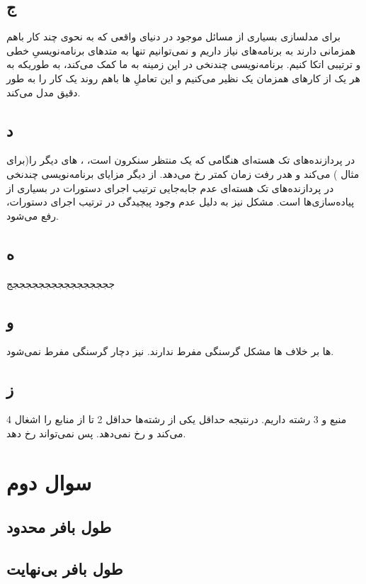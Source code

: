 \documentclass{article}
\begin{document}
\subsection{ج}
برای مدلسازی بسیاری از مسائل موجود در دنیای واقعی که به نحوی چند کار باهم همزمانی دارند به برنامه‌های  نیاز داریم و نمی‌توانیم تنها به متدهای برنامه‌نویسیِ خطی و ترتیبی اتکا کنیم. برنامه‌نویسی چندنخی در این زمینه به ما کمک می‌کند، به طوریکه به هر یک از کارهای همزمان یک  نظیر می‌کنیم و این تعاملِ ها باهم روند یک کار را به طور دقیق مدل می‌کند.
\subsection{د}
در پردازنده‌های تک هسته‌ای هنگامی که یک  منتظر  سنکرون است، ،  های دیگر را(برای مثال )  می‌کند و هدر رفت زمان کمتر رخ می‌دهد. از دیگر مزایای برنامه‌نویسی چندنخی در پردازنده‌های تک هسته‌ای عدم جا‌به‌جایی ترتیب اجرای دستورات در بسیاری از پیاده‌سازی‌ها است. مشکل  نیز به دلیل عدم وجود پیچیدگی در ترتیب اجرای دستورات، رفع می‌شود.
\subsection{ه}
ججججججججججججججججج

\subsection{و}
ها بر خلاف ها مشکل گرسنگی مفرط ندارند.  نیز دچار گرسنگی مفرط نمی‌شود.
\subsection{ز}
4 منبع و 3 رشته داریم. درنتیجه حداقل یکی از رشته‌ها حداقل 2 تا از منابع را اشغال می‌کند و  رخ نمی‌دهد. پس  نمی‌تواند رخ دهد.
\newpage

\section{سوال دوم}
\subsection{طول بافر محدود}
\lr{}
\subsection{طول بافر بی‌نهایت}
\lr{}
\end{document}
